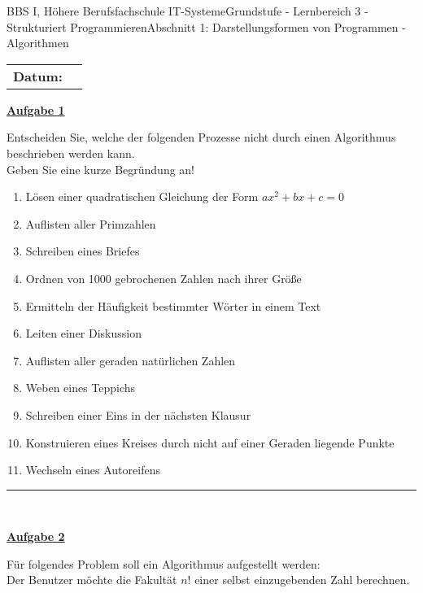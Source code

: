 \documentclass[oneside,openany,headings=optiontotoc,11pt,numbers=noenddot]{scrreprt}
\begin{document}
		\begin{worksheet}{BBS I, Höhere Berufsfachschule IT-Systeme}{Grundstufe - Lernbereich 3 - Strukturiert Programmieren}{Abschnitt 1: Darstellungsformen von Programmen - Algorithmen}
			\par\noindent
			\begin{tabularx}{\textwidth}{lX}
				\textbf{Datum:} & \\
				\cline{2-2}
			\end{tabularx}
			\begin{framed}
				\noindent
				\underline{\textbf{Aufgabe 1}}\\
				\par
				 Entscheiden Sie, welche der folgenden Prozesse nicht durch einen Algorithmus beschrieben werden kann.\\
				 Geben Sie eine kurze Begründung an!
				 \begin{enumerate}
				 	\item Lösen einer quadratischen Gleichung der Form \(ax^2 + bx+c = 0\)
				 	\item Auflisten aller Primzahlen
				 	\item Schreiben eines Briefes
				 	\item Ordnen von 1000 gebrochenen Zahlen nach ihrer Größe
				 	\item Ermitteln der Häufigkeit bestimmter Wörter in einem Text
				 	\item Leiten einer Diskussion
				 	\item Auflisten aller geraden natürlichen Zahlen
				 	\item Weben eines Teppichs
				 	\item Schreiben einer Eins in der nächsten Klausur
				 	\item Konstruieren eines Kreises durch nicht auf einer Geraden liegende Punkte
				 	\item Wechseln eines Autoreifens
				\end{enumerate}
				\par\bigskip\noindent
				\rule{\textwidth}{0.1pt}\\
				\par\bigskip\noindent
			 	\underline{\textbf{Aufgabe 2}}\\
			 	\par\noindent
			 	Für folgendes Problem soll ein Algorithmus aufgestellt werden:\\
			 	Der Benutzer möchte die Fakultät \(n!\) einer selbst einzugebenden Zahl berechnen.\\

\end{framed}
\end{worksheet}
\end{document}
